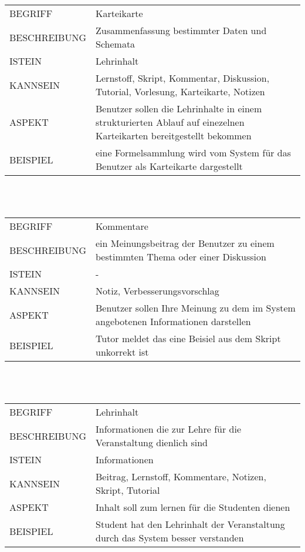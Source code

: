 \documentclass[12pt,a4paper]{article}
\begin{document}
\begin{tabular}{l p{10cm}}
BEGRIFF 	 & Karteikarte \\ 
BESCHREIBUNG & Zusammenfassung bestimmter Daten und Schemata\\ 
ISTEIN   	 & Lehrinhalt\\
KANNSEIN 	 & Lernstoff, Skript, Kommentar, Diskussion, Tutorial, Vorlesung, Karteikarte, Notizen\\ 
ASPEKT   	 & Benutzer sollen die Lehrinhalte in einem strukturierten Ablauf auf einezelnen Karteikarten bereitgestellt bekommen\\
BEISPIEL 	 & eine Formelsammlung wird vom System für das Benutzer als Karteikarte dargestellt\\
\hline
\end{tabular}\\\\  

\vspace{1cm}

\begin{tabular}{l p{10cm}}
BEGRIFF 	 & Kommentare \\ 
BESCHREIBUNG & ein Meinungsbeitrag der Benutzer zu einem bestimmten Thema oder einer Diskussion\\ 
ISTEIN   	 & -\\
KANNSEIN 	 & Notiz, Verbesserungsvorschlag\\ 
ASPEKT   	 & Benutzer sollen Ihre Meinung zu dem im System angebotenen Informationen darstellen\\
BEISPIEL 	 & Tutor meldet das eine Beisiel aus dem Skript unkorrekt ist\\
\hline
\end{tabular}\\\\  

\begin{tabular}{l p{10cm}}
BEGRIFF 	 & Lehrinhalt \\ 
BESCHREIBUNG & Informationen die zur Lehre für die Veranstaltung dienlich sind\\ 
ISTEIN   	 & Informationen\\
KANNSEIN 	 & Beitrag, Lernstoff, Kommentare, Notizen, Skript, Tutorial\\ 
ASPEKT   	 & Inhalt soll zum lernen für die Studenten dienen\\
BEISPIEL 	 & Student hat den Lehrinhalt der Veranstaltung durch das System besser verstanden\\
\hline
\end{tabular}\\\\  
\end{document}
